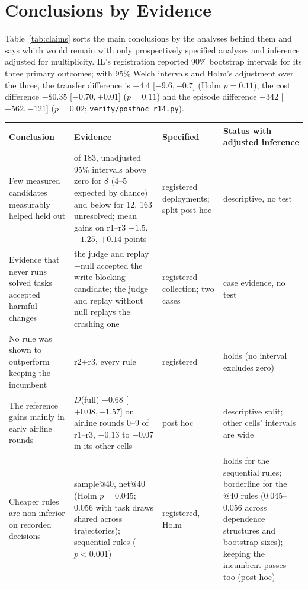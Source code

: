 \documentclass[11pt]{article}
\begin{document}
\section{Conclusions by Evidence}
\label{app:claims}

Table~\ref{tab:claims} sorts the main conclusions by the analyses behind them and says which would remain with only prospectively specified analyses and inference adjusted for multiplicity. IL's registration reported 90\% bootstrap intervals for its three primary outcomes; with 95\% Welch intervals and Holm's adjustment over the three, the transfer difference is $-4.4$ [$-9.6,+0.7$] (Holm $p=0.11$), the cost difference $-\$0.35$ [$-0.70,+0.01$] ($p=0.11$) and the episode difference $-342$ [$-562,-121$] ($p=0.02$; \texttt{verify/posthoc\_r14.py}).

\begin{table}[p]
\centering\footnotesize
\setlength{\tabcolsep}{3pt}
\begin{tabular}{@{}>{\raggedright\arraybackslash}p{4.0cm}>{\raggedright\arraybackslash}p{5.1cm}>{\raggedright\arraybackslash}p{2.6cm}>{\raggedright\arraybackslash}p{3.6cm}@{}}
\toprule
Conclusion & Evidence & Specified & Status with adjusted inference \\
\midrule
Few measured candidates measurably helped held out & of 183, unadjusted 95\% intervals above zero for 8 (4--5 expected by chance) and below for 12, 163 unresolved; mean gains on r1--r3 $-1.5$, $-1.25$, $+0.14$ points & registered deployments; split post hoc & descriptive, no test \\
Evidence that never runs solved tasks accepted harmful changes & the judge and replay$-$null accepted the write-blocking candidate; the judge and replay without null replays the crashing one & registered collection; two cases & case evidence, no test \\
No rule was shown to outperform keeping the incumbent & r2+r3, every rule & registered & holds (no interval excludes zero) \\
The reference gains mainly in early airline rounds & $D$(full) $+0.68$ [$+0.08,+1.57$] on airline rounds 0--9 of r1--r3, $-0.13$ to $-0.07$ in its other cells & post hoc & descriptive split; other cells' intervals are wide \\
Cheaper rules are non-inferior on recorded decisions & sample@40, net@40 (Holm $p=0.045$; 0.056 with task draws shared across trajectories); sequential rules ($p<0.001$) & registered, Holm & holds for the sequential rules; borderline for the @40 rules (0.045--0.056 across dependence structures and bootstrap sizes); keeping the incumbent passes too (post hoc) \\

\end{tabular}
\end{table}
\end{document}
